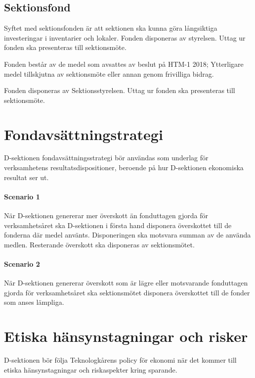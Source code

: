 \documentclass{dsekprotokoll}
\begin{document}
\subsection{Sektionsfond}
Syftet med sektionsfonden är att sektionen ska kunna göra långsiktiga investeringar i inventarier och lokaler. Fonden disponeras av styrelsen. Uttag ur fonden ska presenteras
till sektionsmöte.

Fonden består av de medel som avsattes av beslut på HTM-1 2018; Ytterligare medel tillskjutna av
sektionsmöte eller annan genom frivilliga bidrag.

Fonden disponeras av Sektionsstyrelsen. Uttag ur fonden ska presenteras till sektionsmöte.

\section{Fondavsättningstrategi}
D-sektionen fondavsättningsstrategi bör användas som underlag för verksamhetens resultatsdispositioner, beroende på hur D-sektionen ekonomiska resultat ser ut.


\paragraph{Scenario 1}  När D-sektionen genererar mer överskott än fonduttagen gjorda för verksamhetsåret ska D-sektionen i första hand disponera överskottet till de fonderna där medel använts.
Disponeringen ska motsvara summan av de använda medlen. Resterande överskott ska disponeras av
sektionsmötet.


\paragraph{Scenario 2} När D-sektionen genererar överskott som är lägre eller motsvarande fonduttagen
gjorda för verksamhetsåret ska sektionsmötet disponera överskottet till de fonder som anses lämpliga.

\section{Etiska hänsynstagningar och risker}

D-sektionen bör följa Teknologkårens policy för ekonomi när det kommer till etiska hänsynstagningar och riskaspekter kring sparande.
\end{document}
